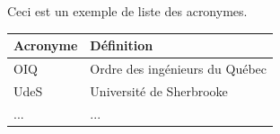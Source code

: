 Ceci est un exemple de liste des acronymes.

\begin{center}
\begin{tabular}{ll}
\toprule
\textbf{Acronyme} & \textbf{Définition} \\ \midrule
OIQ  & Ordre des ingénieurs du Québec   \\
UdeS & Université de Sherbrooke         \\
...  & ... \\
\bottomrule
\end{tabular}
\end{center}
